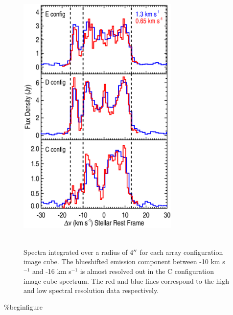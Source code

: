 \documentclass[preprint2]{aastex}
\begin{document}
\clearpage

\begin{figure}
\includegraphics[trim=80pt 60pt 10pt 50pt, clip, width=8.0cm, height=14.0cm]{fig1_new.eps}
\caption{Spectra integrated over a radius of 4$\mbox{$^{\prime\prime}$}$ for each array configuration image cube. The blueshifted emission component between -10 km s${}^{-1}$ and -16 km s${}^{-1}$ is almost resolved out in the C configuration image cube spectrum. The red and blue lines correspond to the high and low spectral resolution data respectively.\label{fig1}}
\label{fig:fig1}
\end{figure}

\%begin{figure}
\end{document}
